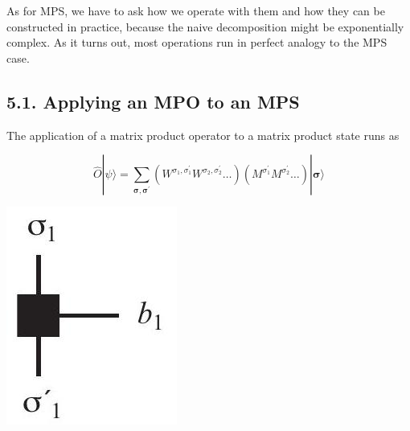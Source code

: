 \documentclass[12pt]{article}
\begin{document}
As for MPS, we have to ask how we operate with them and how they can be constructed in practice, because the naive decomposition might be exponentially complex. As it turns out, most operations run in perfect analogy to the MPS case.

\subsection*{5.1. Applying an MPO to an MPS}
The application of a matrix product operator to a matrix product state runs as

$$
\hat{O}|\psi\rangle=\sum_{\boldsymbol{\sigma}, \boldsymbol{\sigma}^{\prime}}\left(W^{\sigma_{1}, \sigma_{1}^{\prime}} W^{\sigma_{2}, \sigma_{2}^{\prime}} \ldots\right)\left(M^{\sigma_{1}^{\prime}} M^{\sigma_{2}^{\prime}} \ldots\right)|\boldsymbol{\sigma}\rangle
$$

\begin{center}
\includegraphics[max width=\textwidth]{2024_05_04_afc4ad226da9ccfe0ac8g-057}
\end{center}
\end{document}
